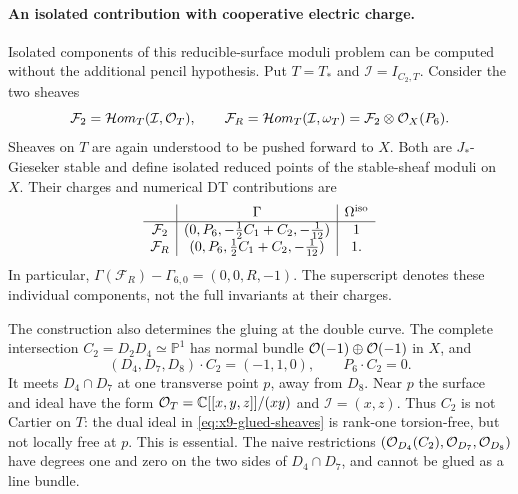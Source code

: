 \paragraph{An isolated contribution with cooperative electric charge.}
Isolated components of this reducible-surface moduli problem can be computed
without the additional pencil hypothesis. Put $T=T_*$ and
$\mathcal I=I_{C_2,T}$. Consider the two sheaves
\begin{equation}
 \mathcal F_2=\mathcal Hom_T(\mathcal I,\mathcal O_T),\qquad
 \mathcal F_R=\mathcal Hom_T(\mathcal I,\omega_T)
             =\mathcal F_2\otimes\mathcal O_X(P_6).
 \label{eq:x9-glued-sheaves}
\end{equation}
Sheaves on $T$ are again understood to be pushed forward to $X$.
Both are $J_*$-Gieseker stable and define isolated reduced points of
the stable-sheaf moduli on $X$. Their charges and numerical DT
contributions are
\begin{equation}
 \begin{array}{c|c|c}
 &\Gamma&\Omega^{\rm iso}\\\hline
 \mathcal F_2&(0,P_6,-\tfrac12 C_1+C_2,-\tfrac1{12})&1\\
 \mathcal F_R&(0,P_6,\tfrac12 C_1+C_2,-\tfrac1{12})&1 .
 \end{array}
 \label{eq:x9-glued-indices}
\end{equation}
In particular,
$\Gamma(\mathcal F_R)-\Gamma_{6,0}=(0,0,R,-1)$.
The superscript denotes these individual components, not the full
invariants at their charges.

The construction also determines the gluing at the double curve.
The complete intersection $C_2=D_2D_4\simeq\mathbb P^1$ has
normal bundle $\mathcal O(-1)\oplus\mathcal O(-1)$ in $X$, and
\begin{equation}
 (D_4,D_7,D_8)\cdot C_2=(-1,1,0),\qquad P_6\cdot C_2=0.
 \label{eq:x9-gluing-incidence}
\end{equation}
It meets $D_4\cap D_7$ at one transverse point $p$, away from $D_8$.
Near $p$ the surface and ideal have the form
$\mathcal O_T=\mathbb C[[x,y,z]]/(xy)$ and $\mathcal I=(x,z)$.
Thus $C_2$ is not Cartier on $T$: the dual ideal in
\eqref{eq:x9-glued-sheaves} is rank-one torsion-free, but not locally
free at $p$. This is essential. The naive restrictions
$(\mathcal O_{D_4}(C_2),\mathcal O_{D_7},\mathcal O_{D_8})$ have degrees one and zero
on the two sides of $D_4\cap D_7$, and cannot be glued as a line
bundle.

